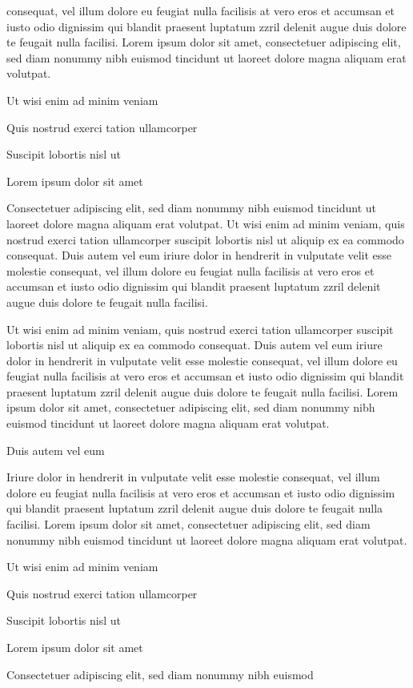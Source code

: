\documentclass[11pt]{article}\makeatletter
\begin{document}
      consequat, vel illum dolore eu feugiat nulla facilisis at vero eros et
      accumsan et iusto odio dignissim qui blandit praesent luptatum zzril
      delenit augue duis dolore te feugait nulla facilisi. Lorem ipsum dolor
      sit amet, consectetuer adipiscing elit, sed diam nonummy nibh euismod
      tincidunt ut laoreet dolore magna aliquam erat volutpat. \par Ut wisi enim ad minim veniam\par Quis nostrud exerci tation ullamcorper \par Suscipit lobortis nisl ut \par Lorem ipsum dolor sit amet\par Consectetuer adipiscing elit, sed diam nonummy nibh euismod
      tincidunt ut laoreet dolore magna aliquam erat volutpat. Ut wisi enim
      ad minim veniam, quis nostrud exerci tation ullamcorper suscipit
      lobortis nisl ut aliquip ex ea commodo consequat. Duis autem vel eum
      iriure dolor in hendrerit in vulputate velit esse molestie consequat,
      vel illum dolore eu feugiat nulla facilisis at vero eros et accumsan
      et iusto odio dignissim qui blandit praesent luptatum zzril delenit
      augue duis dolore te feugait nulla facilisi.\par Ut wisi enim ad minim veniam, quis nostrud exerci tation
      ullamcorper suscipit lobortis nisl ut aliquip ex ea commodo
      consequat. Duis autem vel eum iriure dolor in hendrerit in vulputate
      velit esse molestie consequat, vel illum dolore eu feugiat nulla
      facilisis at vero eros et accumsan et iusto odio dignissim qui blandit
      praesent luptatum zzril delenit augue duis dolore te feugait nulla
      facilisi. Lorem ipsum dolor sit amet, consectetuer adipiscing elit,
      sed diam nonummy nibh euismod tincidunt ut laoreet dolore magna
      aliquam erat volutpat. \par Duis autem vel eum \par Iriure dolor in hendrerit in vulputate velit esse molestie
      consequat, vel illum dolore eu feugiat nulla facilisis at vero eros et
      accumsan et iusto odio dignissim qui blandit praesent luptatum zzril
      delenit augue duis dolore te feugait nulla facilisi. Lorem ipsum dolor
      sit amet, consectetuer adipiscing elit, sed diam nonummy nibh euismod
      tincidunt ut laoreet dolore magna aliquam erat volutpat. \par Ut wisi enim ad minim veniam\par Quis nostrud exerci tation ullamcorper \par Suscipit lobortis nisl ut \par Lorem ipsum dolor sit amet\par Consectetuer adipiscing elit, sed diam nonummy nibh euismod
\end{document}
